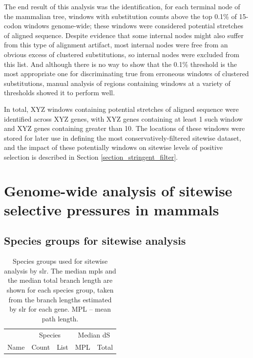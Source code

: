 The end result of this analysis was the identification, for each
terminal node of the mammalian tree, windows with \nsyn substitution
counts above the top 0.1\% of 15-codon windows genome-wide; these
windows were considered potential stretches of \nhom aligned
sequence. Despite evidence that some internal nodes might also suffer
from this type of alignment artifact, most internal nodes were free
from an obvious excess of clustered \nsyn substitutions, so internal
nodes were excluded from this list. And although there is no way to
show that the 0.1\% threshold is the most appropriate one for
discriminating true from erroneous windows of clustered substitutions,
manual analysis of regions containing windows at a variety of
thresholds showed it to perform well.

In total, XYZ windows containing potential stretches of \nhom aligned
sequence were identified across XYZ genes, with XYZ genes containing
at least 1 such window and XYZ genes containing greater than 10. The
locations of these windows were stored for later use in defining the
most conservatively-filtered sitewise dataset, and the impact of these
potentially \nhom windows on sitewise levels of positive selection is
described in Section \ref{section_stringent_filter}.

\section{Genome-wide analysis of sitewise selective pressures in mammals}

\subsection{Species groups for sitewise analysis}

\begin{table}
\centering \footnotesize
\begin{tabular}{lrb{8cm}rr}
\toprule
 & \multicolumn{2}{c}{Species} & \multicolumn{2}{c}{Median dS} \\
\cmidrule(r){2-3} \cmidrule{4-5}
Name & Count & List & MPL & Total \\
  \midrule

\bottomrule
\end{tabular}
\caption{Species groups used for sitewise analysis by \ac{slr}. The
  median \acp{mpl} and the median total branch length are shown for
  each species group, taken from the \ngenes branch lengths estimated
  by \ac{slr} for each gene. MPL -- mean path length.}
\label{table_species_set_summary}
\end{table}

